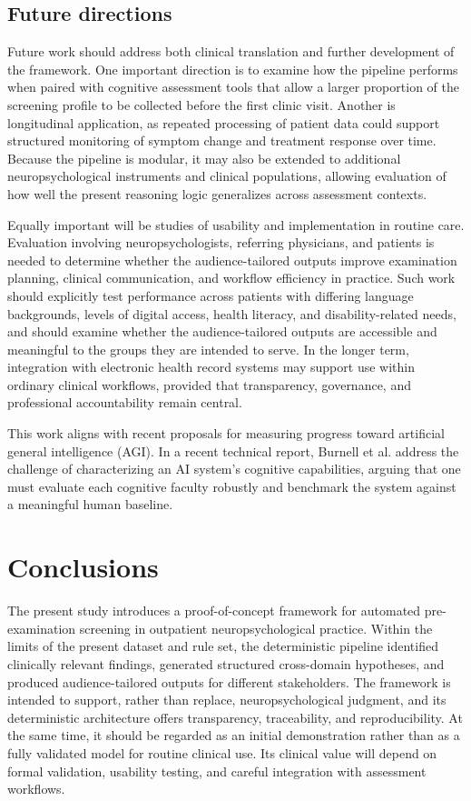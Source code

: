 \documentclass[11pt,a4paper]{article}
\begin{document}
\subsection{Future directions}

Future work should address both clinical translation and further development of the framework. 
One important direction is to examine how the pipeline performs when paired with cognitive assessment tools that allow a 
larger proportion of the screening profile to be collected before the first clinic visit. 
Another is longitudinal application, as repeated processing of patient data could support structured monitoring of 
symptom change and treatment response over time. Because the pipeline is modular, it may also be extended to additional 
neuropsychological instruments and clinical populations, allowing evaluation of how well the present reasoning logic 
generalizes across assessment contexts.

Equally important will be studies of usability and implementation in routine care. 
Evaluation involving neuropsychologists, referring physicians, and patients is needed to determine whether 
the audience-tailored outputs improve examination planning, clinical communication, and workflow efficiency in practice. 
Such work should explicitly test performance across patients with differing language backgrounds, levels of digital access, 
health literacy, and disability-related needs, and should examine whether the audience-tailored outputs are 
accessible and meaningful to the groups they are intended to serve. In the longer term, integration with electronic 
health record systems may support use within ordinary clinical workflows, provided that transparency, 
governance, and professional accountability remain central.

This work aligns with recent proposals for measuring progress toward artificial general intelligence (AGI). 
In a recent technical report, Burnell et al. \cite{burnell2026measuring} address the challenge of characterizing an AI system's cognitive 
capabilities, arguing that one must evaluate each cognitive faculty robustly and benchmark the system against a 
meaningful human baseline.


\section{Conclusions}
\label{sec:conclusion}

The present study introduces a proof-of-concept framework for automated pre-examination screening in outpatient neuropsychological practice. Within the limits of the present dataset and rule set, the deterministic pipeline identified clinically relevant findings, generated structured cross-domain hypotheses, and produced audience-tailored outputs for different stakeholders. The framework is intended to support, rather than replace, neuropsychological judgment, and its deterministic architecture offers transparency, traceability, and reproducibility. At the same time, it should be regarded as an initial demonstration rather than as a fully validated model for routine clinical use. Its clinical value will depend on formal validation, usability testing, and careful integration with assessment workflows.
\end{document}
